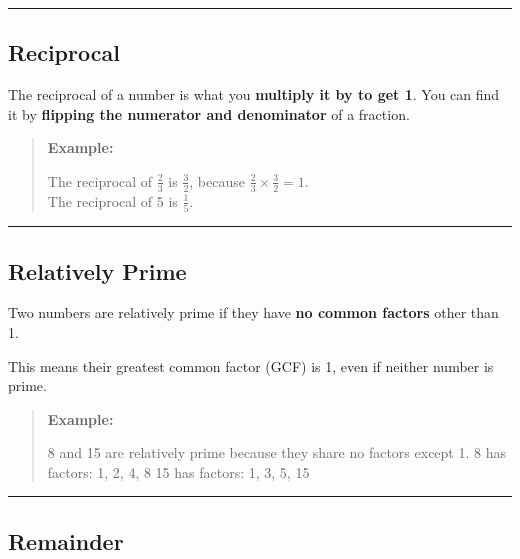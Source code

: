 \documentclass[
  letterpaper,
  DIV=11,
  numbers=noendperiod]{scrreprt}
\begin{document}
\begin{center}\rule{0.5\linewidth}{0.5pt}\end{center}

\subsection*{Reciprocal}\label{glossary-reciprocal}

The reciprocal of a number is what you \textbf{multiply it by to get 1}.
You can find it by \textbf{flipping the numerator and denominator} of a
fraction.

\begin{quote}
\textbf{Example:}

The reciprocal of \(\frac{2}{3}\) is \(\frac{3}{2}\), because
\(\frac{2}{3} \times \frac{3}{2} = 1\).\\
The reciprocal of 5 is \(\frac{1}{5}\).
\end{quote}

\begin{center}\rule{0.5\linewidth}{0.5pt}\end{center}

\subsection*{Relatively Prime}\label{glossary-relatively-prime}

Two numbers are relatively prime if they have \textbf{no common factors}
other than 1.

This means their greatest common factor (GCF) is 1, even if neither
number is prime.

\begin{quote}
\textbf{Example:}

8 and 15 are relatively prime because they share no factors except 1. 8
has factors: 1, 2, 4, 8 15 has factors: 1, 3, 5, 15
\end{quote}

\begin{center}\rule{0.5\linewidth}{0.5pt}\end{center}

\subsection*{Remainder}\label{glossary-remainder}
\end{document}
